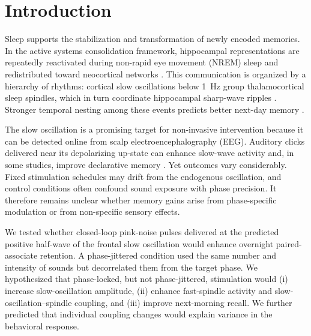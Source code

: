 \section{Introduction}

Sleep supports the stabilization and transformation of newly encoded memories. In the active systems consolidation framework, hippocampal representations are repeatedly reactivated during non-rapid eye movement (NREM) sleep and redistributed toward neocortical networks \citep{Diekelmann2010,Rasch2013}. This communication is organized by a hierarchy of rhythms: cortical slow oscillations below 1~Hz group thalamocortical sleep spindles, which in turn coordinate hippocampal sharp-wave ripples \citep{Sirota2003,Staresina2015}. Stronger temporal nesting among these events predicts better next-day memory \citep{Muehlroth2019}.

The slow oscillation is a promising target for non-invasive intervention because it can be detected online from scalp electroencephalography (EEG). Auditory clicks delivered near its depolarizing up-state can enhance slow-wave activity and, in some studies, improve declarative memory \citep{Ngo2013,Papalambros2017}. Yet outcomes vary considerably. Fixed stimulation schedules may drift from the endogenous oscillation, and control conditions often confound sound exposure with phase precision. It therefore remains unclear whether memory gains arise from phase-specific modulation or from non-specific sensory effects.

We tested whether closed-loop pink-noise pulses delivered at the predicted positive half-wave of the frontal slow oscillation would enhance overnight paired-associate retention. A phase-jittered condition used the same number and intensity of sounds but decorrelated them from the target phase. We hypothesized that phase-locked, but not phase-jittered, stimulation would (i) increase slow-oscillation amplitude, (ii) enhance fast-spindle activity and slow-oscillation--spindle coupling, and (iii) improve next-morning recall. We further predicted that individual coupling changes would explain variance in the behavioral response.

